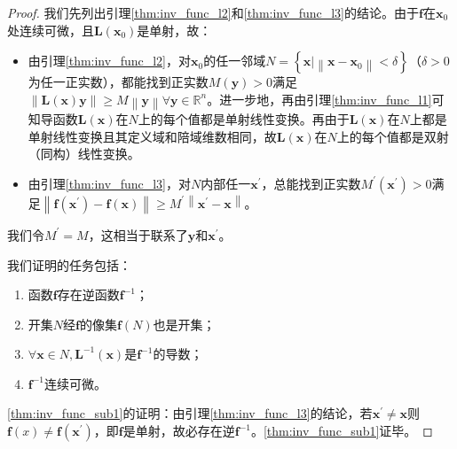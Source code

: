 \documentclass[main.tex]{subfiles}
\begin{document}
\begin{proof}
    我们先列出引理\ref{thm:inv_func_l2}和\ref{thm:inv_func_l3}的结论。由于$\mathbf{f}$在$\mathbf{x}_0$处连续可微，且$\mathbf{L}\left(\mathbf{x}_0\right)$是单射，故：
    \begin{itemize}
        \item 由引理\ref{thm:inv_func_l2}，对$\mathbf{x}_0$的任一邻域$N=\left\{\mathbf{x}|\left\|\mathbf{x}-\mathbf{x}_0\right\|<\delta\right\}$（$\delta>0$为任一正实数），都能找到正实数$M\left(\mathbf{y}\right)>0$满足$\left\|\mathbf{L}\left(\mathbf{x}\right)\mathbf{y}\right\|\geq M\left\|\mathbf{y}\right\|\forall\mathbf{y}\in\mathbb{R}^n$。进一步地，再由引理\ref{thm:inv_func_l1}可知导函数$\mathbf{L}\left(\mathbf{x}\right)$在$N$上的每个值都是单射线性变换。再由于$\mathbf{L}\left(\mathbf{x}\right)$在$N$上都是单射线性变换且其定义域和陪域维数相同，故$\mathbf{L}\left(\mathbf{x}\right)$在$N$上的每个值都是双射（同构）线性变换。
        \item 由引理\ref{thm:inv_func_l3}，对$N$内部任一$\mathbf{x}^\prime$，总能找到正实数$M^\prime\left(\mathbf{x}^\prime\right)>0$满足$\left\|\mathbf{f}\left(\mathbf{x}^\prime\right)-\mathbf{f}\left(\mathbf{x}\right)\right\|\geq M^\prime\left\|\mathbf{x}^\prime-\mathbf{x}\right\|$。
    \end{itemize}
    我们令$M^\prime=M$，这相当于联系了$\mathbf{y}$和$\mathbf{x}^\prime$。

    我们证明的任务包括：
    \begin{enumerate}[label=\Roman*]
        \item\label{thm:inv_func_sub1} 函数$\mathbf{f}$存在逆函数$\mathbf{f}^{-1}$；
        \item\label{thm:inv_func_sub2} 开集$N$经$\mathbf{f}$的像集$\mathbf{f}\left(N\right)$也是开集；
        \item\label{thm:inv_func_sub3} $\forall \mathbf{x}\in N,\mathbf{L}^{-1}\left(\mathbf{x}\right)$是$\mathbf{f}^{-1}$的导数；
        \item\label{thm:inv_func_sub4} $\mathbf{f}^{-1}$连续可微。
    \end{enumerate}

    \ref{thm:inv_func_sub1}的证明：由引理\ref{thm:inv_func_l3}的结论，若$\mathbf{x}^\prime\neq\mathbf{x}$则$\mathbf{f}\left(x\right)\neq\mathbf{f}\left(\mathbf{x}^\prime\right)$，即$\mathbf{f}$是单射，故必存在逆$\mathbf{f}^{-1}$。\ref{thm:inv_func_sub1}证毕。


\end{proof}
\end{document}
